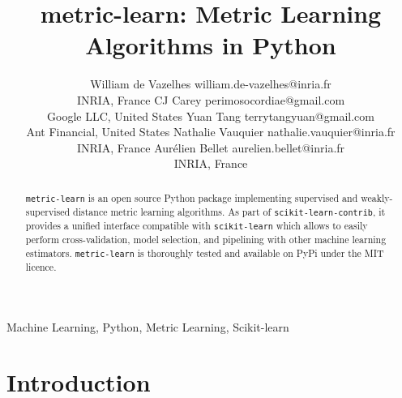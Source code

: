 \documentclass[twoside,11pt]{article}
\begin{document}
\title{metric-learn: Metric Learning Algorithms in Python}

\author{\name William de Vazelhes \email william.de-vazelhes@inria.fr \\
       \addr INRIA, France
       \AND
       \name CJ Carey \email perimosocordiae@gmail.com \\
       \addr Google LLC, United States
       \AND
       \name Yuan Tang \email terrytangyuan@gmail.com \\
       \addr Ant Financial, United States
       \AND
       \name Nathalie Vauquier \email nathalie.vauquier@inria.fr \\
       \addr INRIA, France
       \AND
       \name Aur\'elien Bellet \email aurelien.bellet@inria.fr \\
       \addr INRIA, France
       }

\editor{}

\maketitle

\begin{abstract}%
\texttt{metric-learn} is an open source Python package implementing supervised and weakly-supervised distance metric learning algorithms. As part of \texttt{scikit-learn-contrib}, it provides a unified interface compatible with \texttt{scikit-learn} which allows to easily perform cross-validation, model selection, and pipelining with other machine learning estimators. \texttt{metric-learn} is thoroughly tested and available on PyPi under the MIT licence.
\end{abstract}

\begin{keywords}
  Machine Learning, Python, Metric Learning, Scikit-learn
\end{keywords}

\section{Introduction}
\end{document}
